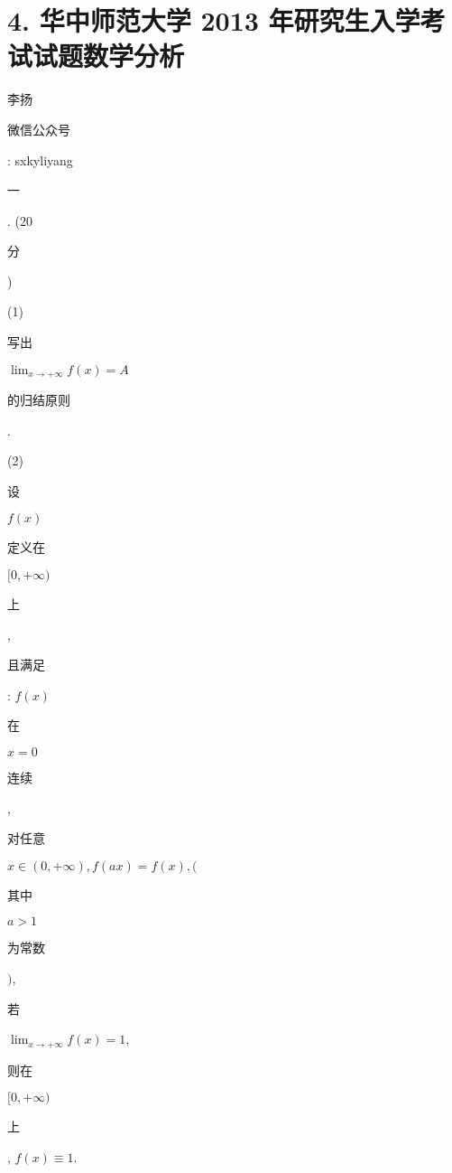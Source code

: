 \documentclass[10pt]{article}
\begin{document}
\section{4. 华中师范大学 2013 年研究生入学考试试题数学分析}
\begin{CJK}{UTF8}{mj}李扬\end{CJK}

\begin{CJK}{UTF8}{mj}微信公众号\end{CJK}: sxkyliyang

\begin{CJK}{UTF8}{mj}一\end{CJK}. (20 \begin{CJK}{UTF8}{mj}分\end{CJK})

(1) \begin{CJK}{UTF8}{mj}写出\end{CJK} $\lim _{x \rightarrow+\infty} f(x)=A$ \begin{CJK}{UTF8}{mj}的归结原则\end{CJK}.

(2) \begin{CJK}{UTF8}{mj}设\end{CJK} $f(x)$ \begin{CJK}{UTF8}{mj}定义在\end{CJK} $[0,+\infty)$ \begin{CJK}{UTF8}{mj}上\end{CJK}, \begin{CJK}{UTF8}{mj}且满足\end{CJK}: $f(x)$ \begin{CJK}{UTF8}{mj}在\end{CJK} $x=0$ \begin{CJK}{UTF8}{mj}连续\end{CJK}, \begin{CJK}{UTF8}{mj}对任意\end{CJK} $x \in(0,+\infty), f(a x)=f(x),($ \begin{CJK}{UTF8}{mj}其中\end{CJK} $a>1$ \begin{CJK}{UTF8}{mj}为常数\end{CJK} $)$, \begin{CJK}{UTF8}{mj}若\end{CJK} $\lim _{x \rightarrow+\infty} f(x)=1$, \begin{CJK}{UTF8}{mj}则在\end{CJK} $[0,+\infty)$ \begin{CJK}{UTF8}{mj}上\end{CJK}, $f(x) \equiv 1$.
\end{document}
